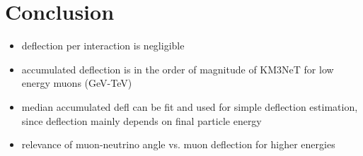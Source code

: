 \section{Conclusion}\label{sec:conclusion}
\begin{itemize}
    \item deflection per interaction is negligible
    \item accumulated deflection is in the order of magnitude of KM3NeT for low energy muons (GeV-TeV) 
    \item median accumulated defl can be fit and used for simple deflection estimation, since deflection mainly depends on final particle energy
    \item relevance of muon-neutrino angle vs. muon deflection for higher energies
\end{itemize}